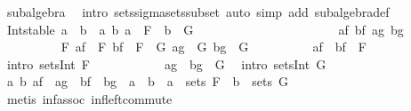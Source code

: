 \begin{isabellebody}
\ subalgebra\ \isamarkupfalse%
\ {\isacharparenleft}{\kern0pt}intro\ sets{\isachardot}{\kern0pt}sigma{\isacharunderscore}{\kern0pt}sets{\isacharunderscore}{\kern0pt}subset{\isacharcomma}{\kern0pt}\ auto\ simp\ add{\isacharcolon}{\kern0pt}\ subalgebra{\isacharunderscore}{\kern0pt}def{\isacharparenright}{\kern0pt}\isanewline
\ \ \ \ \isamarkupfalse%
\ {\isachardoublequoteopen}Int{\isacharunderscore}{\kern0pt}stable\ {\isacharbraceleft}{\kern0pt}a\ {\isasyminter}\ b\ {\isacharbar}{\kern0pt}\ a\ b{\isachardot}{\kern0pt}\ a\ {\isasymin}\ F\ {\isasymand}\ b\ {\isasymin}\ G{\isacharbraceright}{\kern0pt}{\isachardoublequoteclose}\isanewline
\ \ \ \ \isamarkupfalse%
\ {\isacharminus}{\kern0pt}\isanewline
\ \ \ \ \ \ \isacommand{{\isacharbraceleft}{\kern0pt}}\isamarkupfalse%
\isanewline
\ \ \ \ \ \ \ \ \isamarkupfalse%
\ af\ bf\ ag\ bg\isanewline
\ \ \ \ \ \ \ \ \isamarkupfalse%
\ F{\isacharcolon}{\kern0pt}\ {\isachardoublequoteopen}af\ {\isasymin}\ F{\isachardoublequoteclose}\ {\isachardoublequoteopen}bf\ {\isasymin}\ F{\isachardoublequoteclose}\ \ G{\isacharcolon}{\kern0pt}\ {\isachardoublequoteopen}ag\ {\isasymin}\ G{\isachardoublequoteclose}\ {\isachardoublequoteopen}bg\ {\isasymin}\ G{\isachardoublequoteclose}\isanewline
\ \ \ \ \ \ \ \ \isamarkupfalse%
\ {\isachardoublequoteopen}af\ {\isasyminter}\ bf\ {\isasymin}\ F{\isachardoublequoteclose}\ \isamarkupfalse%
\ {\isacharparenleft}{\kern0pt}intro\ sets{\isachardot}{\kern0pt}Int\ F{\isacharparenright}{\kern0pt}\isanewline
\ \ \ \ \ \ \ \ \isamarkupfalse%
\ \isamarkupfalse%
\ {\isachardoublequoteopen}ag\ {\isasyminter}\ bg\ {\isasymin}\ G{\isachardoublequoteclose}\ \isamarkupfalse%
\ {\isacharparenleft}{\kern0pt}intro\ sets{\isachardot}{\kern0pt}Int\ G{\isacharparenright}{\kern0pt}\isanewline
\ \ \ \ \ \ \ \ \isamarkupfalse%
\ \isamarkupfalse%
\ {\isachardoublequoteopen}{\isasymexists}a\ b{\isachardot}{\kern0pt}\ af\ {\isasyminter}\ ag\ {\isasyminter}\ {\isacharparenleft}{\kern0pt}bf\ {\isasyminter}\ bg{\isacharparenright}{\kern0pt}\ {\isacharequal}{\kern0pt}\ a\ {\isasyminter}\ b\ {\isasymand}\ a\ {\isasymin}\ sets\ F\ {\isasymand}\ b\ {\isasymin}\ sets\ G{\isachardoublequoteclose}\ \isamarkupfalse%
\ {\isacharparenleft}{\kern0pt}metis\ inf{\isacharunderscore}{\kern0pt}assoc\ inf{\isacharunderscore}{\kern0pt}left{\isacharunderscore}{\kern0pt}commute{\isacharparenright}{\kern0pt}\isanewline

\end{isabellebody}
